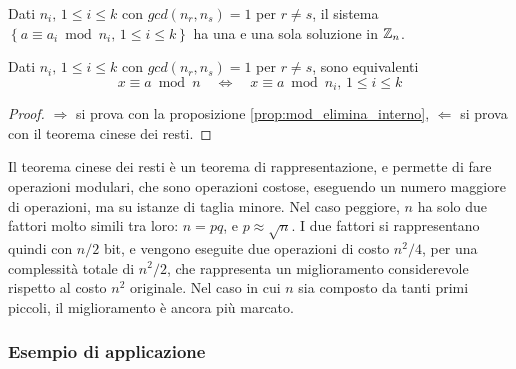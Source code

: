 \begin{corollario}
    Dati $
    n_i, \,
    1 \leq i \leq k
    $ con $
    gcd(n_r, n_s) = 1
    $ per $
    r \ne s
    $, il sistema $
    \left\{ 
        a \equiv a_i \bmod n_i
        , \,
        1 \leq i \leq k
    \right\}
    $ ha una e una sola soluzione in $
    \mathbb{Z}_{n} 
    $.
\end{corollario}
\begin{corollario}
    Dati $
    n_i, \,
    1 \leq i \leq k
    $ con $
    gcd(n_r, n_s) = 1
    $ per $
    r \ne s
    $, sono equivalenti
    \begin{equation*}
        x \equiv a \bmod n
        \quad
        \Leftrightarrow
        \quad
        x \equiv a \bmod n_i
        , \,
        1 \leq i \leq k
    \end{equation*}
    \begin{proof}
        $\Rightarrow$ si prova con la proposizione \ref{prop:mod_elimina_interno},
        $\Leftarrow$ si prova con il teorema cinese dei resti.
    \end{proof}
\end{corollario}

Il teorema cinese dei resti è un teorema di rappresentazione, e 
permette di fare operazioni modulari, che sono operazioni costose, 
eseguendo un numero maggiore di operazioni, ma su istanze di taglia minore.
Nel caso peggiore, $n$ ha solo due fattori molto simili tra loro: $n=pq$, e $
p \approx \sqrt{n}
$.
I due fattori si rappresentano quindi con $
n/2
$ bit, e vengono eseguite due operazioni di costo $
n^2 /4
$, per una complessità totale di $
n^2 /2
$, che rappresenta un miglioramento considerevole rispetto al costo $
n^2
$ originale.
Nel caso in cui $n$ sia composto da tanti primi piccoli, il miglioramento è ancora più marcato.

\subsubsection{Esempio di applicazione}

